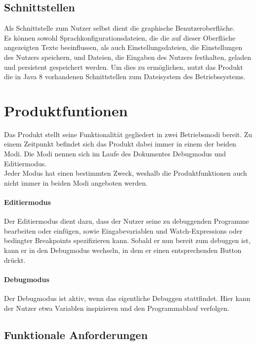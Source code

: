 \documentclass[parskip=full]{scrartcl}
\begin{document}
\subsection{Schnittstellen}
Als Schnittstelle zum Nutzer selbst dient die graphische Benutzeroberfläche. \\ Es können sowohl Sprachkonfigurationsdateien, die die auf dieser Oberfläche angezeigten Texte beeinflussen, als auch Einstellungsdateien, die Einstellungen des Nutzers speichern, und Dateien, die Eingaben des Nutzers festhalten, geladen und persistent gespeichert werden. Um dies zu ermöglichen, nutzt das Produkt die in Java 8 vorhandenen Schnittstellen zum Dateisystem des Betriebssystems. 

\newpage

\section{Produktfuntionen}
Das Produkt stellt seine Funktionalität gegliedert in zwei Betriebsmodi bereit. Zu einem Zeitpunkt befindet sich das Produkt dabei immer in einem der beiden Modi. Die Modi nennen sich im Laufe des Dokumentes \gls{Debugmodus} und \gls{Editiermodus}. \\ Jeder Modus hat einen bestimmten Zweck, weshalb die Produktfunktionen auch nicht immer in beiden Modi angeboten werden. 
\paragraph{Editiermodus} Der \gls{Editiermodus} dient dazu, dass der Nutzer seine zu debuggenden Programme bearbeiten oder einfügen, sowie Eingabevariablen und \glspl{Watch-Expression} oder \glspl{bedingter Breakpoint} spezifizieren kann. Sobald er nun bereit zum debuggen ist, kann er in den Debugmodus wechseln, in dem er einen entsprechenden Button drückt. 
\paragraph{Debugmodus} Der \gls{Debugmodus} ist aktiv, wenn das eigentliche Debuggen stattfindet. Hier kann der Nutzer etwa Variablen inspizieren und den Programmablauf verfolgen. 
	 	\subsection{Funktionale Anforderungen}
\end{document}

